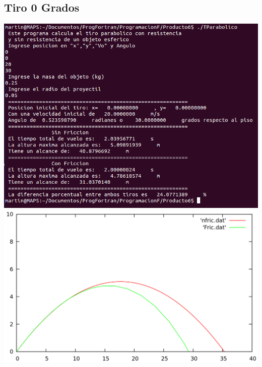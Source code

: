 \documentclass[12pt]{article}
\begin{document}
\subsection{Tiro 0 Grados}
\begin{center}
\includegraphics[width=15cm]{Tiro30g20v.png}
\includegraphics[width=15cm]{Tiro30g.png}
\end{center}
\end{document}
